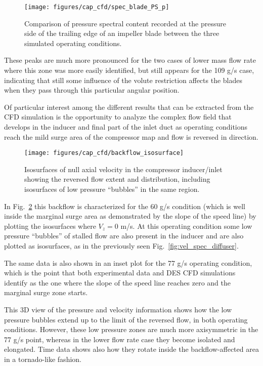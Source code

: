 \begin{figure}[htb!]
\centering
\texttt{[image: figures/cap\_cfd/spec\_blade\_PS\_p]}\\[5mm]
\caption{Comparison of pressure spectral content recorded at the pressure side of the trailing edge of an impeller blade between the three simulated operating conditions.}
\label{fig:cfd_spec_blade_p}
\end{figure}

These peaks are much more pronounced for the two cases of lower mass flow rate where this zone was more easily identified, but still appears for the 109 g/s case, indicating that still some influence of the volute restriction affects the blades when they pass through this particular angular position.

Of particular interest among the different results that can be extracted from the CFD simulation is the opportunity to analyze the complex flow field that develops in the inducer and final part of the inlet duct as operating conditions reach the mild surge area of the compressor map and flow is reversed in direction. 

\begin{figure}[htb!]
\centering
\texttt{[image: figures/cap\_cfd/backflow\_isosurface]}
\caption{Isosurfaces of null axial velocity in the compressor inducer/inlet showing the reversed flow extent and distribution, including isosurfaces of low pressure ``bubbles'' in the same region.}
\label{fig:cfd_backflow_isosurfaces}
\end{figure}

In Fig.~\ref{fig:cfd_backflow_isosurfaces} this backflow is characterized for the 60 g/s condition (which is well inside the marginal surge area as demonstrated by the slope of the speed line) by plotting the isosurfaces where $V_z = 0$ m/s. At this operating condition some low pressure ``bubbles'' of stalled flow are also present in the inducer and are also plotted as isosurfaces, as in the previously seen Fig.~\ref{fig:vel_spec_diffuser}. 

The same data is also shown in an inset plot for the 77 g/s operating condition, which is the point that both experimental data and DES CFD simulations identify as the one where the slope of the speed line reaches zero and the marginal surge zone starts.

This 3D view of the pressure and velocity information shows how the low pressure bubbles extend up to the limit of the reversed flow, in both operating conditions. However, these low pressure zones are much more axisymmetric in the 77 g/s point, whereas in the lower flow rate case they become isolated and elongated. Time data shows also how they rotate inside the backflow-affected area in a tornado-like fashion.


